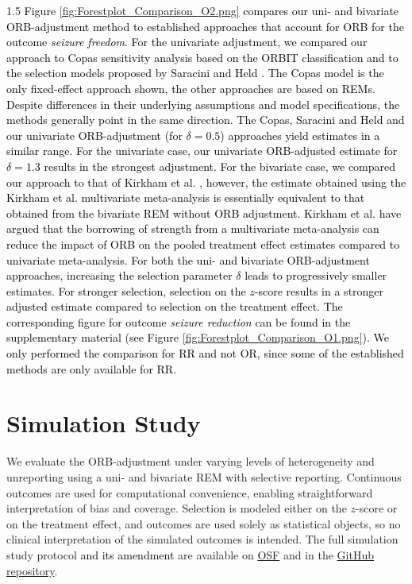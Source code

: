 \documentclass{article}
\newcommand{\mycolor}[1]{\textcolor{black}{#1}}
\begin{document}
\begin{spacing}{1.5}
\mycolor{Figure \ref{fig:Forestplot_Comparison_O2.png} compares our uni- and bivariate ORB-adjustment method to established approaches that account for ORB for the outcome \textit{seizure freedom}. For the univariate adjustment, we compared our approach to Copas sensitivity analysis based on the ORBIT classification \cite{copas2019model} and to the selection models proposed by Saracini and Held \cite{saracini2025addressing}. The Copas model is the only fixed-effect approach shown, the other approaches are based on REMs. Despite differences in their underlying assumptions and model specifications, the methods generally point in the same direction. The Copas, Saracini and Held and our univariate ORB-adjustment (for $\delta = 0.5$) approaches yield estimates in a similar range. For the univariate case, our univariate ORB-adjusted estimate for $\delta = 1.3$ results in the strongest adjustment. For the bivariate case, we compared our approach to that of Kirkham et al. \cite{kirkham2012multivariate}, however, the estimate obtained using the Kirkham et al. multivariate meta-analysis is essentially equivalent to that obtained from the bivariate REM without ORB adjustment. Kirkham et al. \cite{kirkham2012multivariate} have argued that the borrowing of strength from a multivariate meta-analysis can reduce the impact of ORB on the pooled treatment effect estimates compared to univariate meta-analysis. For both the uni- and bivariate ORB-adjustment approaches, increasing the selection parameter $\delta$ leads to progressively smaller estimates. For stronger selection, selection on the $z$-score results in a stronger adjusted estimate compared to selection on the treatment effect. The corresponding figure for outcome \textit{seizure reduction} can be found in the supplementary material (see Figure \ref{fig:Forestplot_Comparison_O1.png}). We only performed the comparison for RR and not OR, since some of the established methods are only available for RR.}

\section{Simulation Study}
\label{SimulationStudy}

We evaluate the ORB-adjustment under varying levels of heterogeneity and unreporting using a uni- and bivariate REM with selective reporting. Continuous outcomes are used for computational convenience, enabling straightforward interpretation of bias and coverage. Selection is modeled either on the $z$-score or on the treatment effect, and outcomes are used solely as statistical objects, so no clinical interpretation of the simulated outcomes is intended. The full simulation study protocol \mycolor{and its amendment} are available on \href{https://osf.io/5f4yx/overview}{OSF} and in the \href{https://github.com/cburgwin/ORB-project-MI-Approach/tree/main}{GitHub repository}.


\end{spacing}
\end{document}
